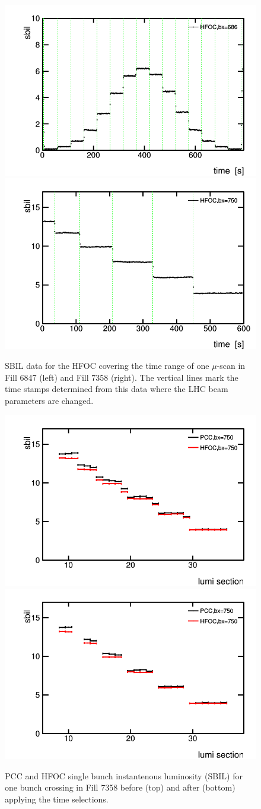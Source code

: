 \begin{figure}[t]
  \begin{center}
    \includegraphics[width=0.47\linewidth]{plots/plot_lumi_vstime_6847.png}
    \includegraphics[width=0.47\linewidth]{plots/plot_lumi_vstime_7358.png}
    \caption{
      SBIL data for the HFOC covering the time range of one $\mu$-scan in Fill 6847 (left) and Fill 7358 (right). The vertical lines mark the time stamps determined from this data where the LHC beam parameters are changed.
    \label{fig:lumivstime}
    }
  \end{center}
\end{figure}


\newpage

\begin{figure}[t]
  \begin{center}
    \includegraphics[width=0.6\linewidth]{plots/plot_lumi_vsls_7358_before.png}
    \includegraphics[width=0.6\linewidth]{plots/plot_lumi_vsls_7358_after.png}
    \caption{
    PCC and HFOC single bunch instantenous luminosity (SBIL) for one bunch crossing in Fill 7358 before (top) and after (bottom) applying the time selections.
    \label{fig:lumivsls}
    }
  \end{center}
\end{figure}
